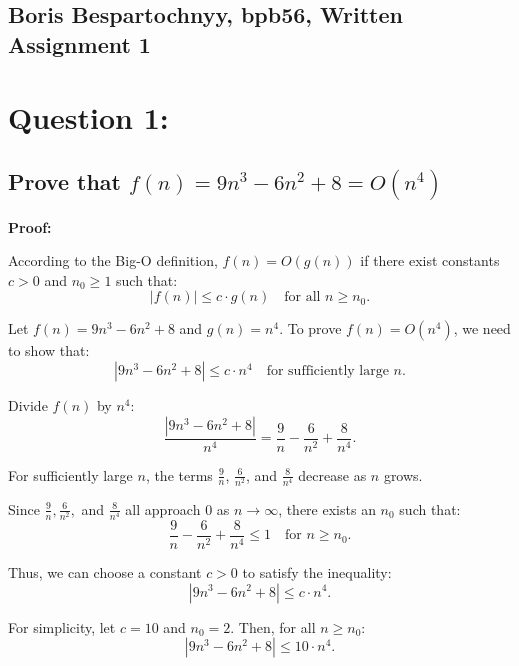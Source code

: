 \documentclass{article}
\begin{document}
\subsection*{Boris Bespartochnyy, bpb56, Written Assignment 1}
\section*{Question 1:}
\subsection*{Prove that \( f(n) = 9n^3 - 6n^2 + 8 = O(n^4) \) }
\textbf{Proof:}

According to the Big-O definition, \( f(n) = O(g(n)) \) if there exist constants \( c > 0 \) and \( n_0 \geq 1 \) such that:
\[
|f(n)| \leq c \cdot g(n) \quad \text{for all } n \geq n_0.
\]

Let \( f(n) = 9n^3 - 6n^2 + 8 \) and \( g(n) = n^4 \). To prove \( f(n) = O(n^4) \), we need to show that:
\[
|9n^3 - 6n^2 + 8| \leq c \cdot n^4 \quad \text{for sufficiently large } n.
\]

Divide \( f(n) \) by \( n^4 \):
\[
\frac{|9n^3 - 6n^2 + 8|}{n^4} = \frac{9}{n} - \frac{6}{n^2} + \frac{8}{n^4}.
\]

For sufficiently large \( n \), the terms \( \frac{9}{n} \), \( \frac{6}{n^2} \), and \( \frac{8}{n^4} \) decrease as \( n \) grows.

Since \( \frac{9}{n}, \frac{6}{n^2}, \) and \( \frac{8}{n^4} \) all approach \( 0 \) as \( n \to \infty \), there exists an \( n_0 \) such that:
\[
\frac{9}{n} - \frac{6}{n^2} + \frac{8}{n^4} \leq 1 \quad \text{for } n \geq n_0.
\]

Thus, we can choose a constant \( c > 0 \) to satisfy the inequality:
\[
|9n^3 - 6n^2 + 8| \leq c \cdot n^4.
\]

For simplicity, let \( c = 10 \) and \( n_0 = 2 \). Then, for all \( n \geq n_0 \):
\[
|9n^3 - 6n^2 + 8| \leq 10 \cdot n^4.
\]
\end{document}
